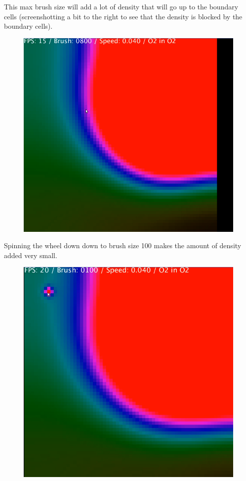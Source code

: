 \documentclass[12pt,a4paper]{book}
\begin{document}
\pagebreak
This max brush size will add a lot of density that will go up to the boundary cells (screenshotting a bit to the right to see that the density is blocked by the boundary cells).

\begin{figure}[H]
	\includegraphics[scale=0.5]{pics/7.png}
\end{figure}

\pagebreak
Spinning the wheel down down to brush size 100 makes the amount of density added very small.

\begin{figure}[H]
	\includegraphics[scale=0.5]{pics/8.png}
\end{figure}
\end{document}

